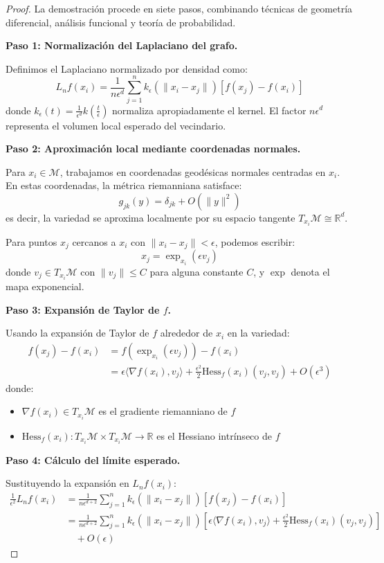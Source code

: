 \begin{proof}
	La demostración procede en siete pasos, combinando técnicas de geometría diferencial, análisis funcional y teoría de probabilidad.

	\textbf{Paso 1: Normalización del Laplaciano del grafo.}

	Definimos el Laplaciano normalizado por densidad como:
	\[
		L_n f(x_i) = \frac{1}{n \epsilon^d} \sum_{j=1}^n k_\epsilon(\|x_i - x_j\|) [f(x_j) - f(x_i)]
	\]
	donde $k_\epsilon(t) = \frac{1}{\epsilon^d} k\left(\frac{t}{\epsilon}\right)$ normaliza apropiadamente el kernel. El factor $n\epsilon^d$ representa el volumen local esperado del vecindario.

	\textbf{Paso 2: Aproximación local mediante coordenadas normales.}

	Para $x_i \in \mathcal{M}$, trabajamos en coordenadas geodésicas normales centradas en $x_i$. En estas coordenadas, la métrica riemanniana satisface:
	\[
		g_{jk}(y) = \delta_{jk} + O(\|y\|^2)
	\]
	es decir, la variedad se aproxima localmente por su espacio tangente $T_{x_i}\mathcal{M} \cong \mathbb{R}^d$.

	Para puntos $x_j$ cercanos a $x_i$ con $\|x_i - x_j\| < \epsilon$, podemos escribir:
	\[
		x_j = \exp_{x_i}(\epsilon v_j)
	\]
	donde $v_j \in T_{x_i}\mathcal{M}$ con $\|v_j\| \leq C$ para alguna constante $C$, y $\exp$ denota el mapa exponencial.

	\textbf{Paso 3: Expansión de Taylor de $f$.}

	Usando la expansión de Taylor de $f$ alrededor de $x_i$ en la variedad:
	\begin{align}
		f(x_j) - f(x_i) &= f(\exp_{x_i}(\epsilon v_j)) - f(x_i)\\
		&= \epsilon \langle \nabla f(x_i), v_j \rangle + \frac{\epsilon^2}{2} \text{Hess}_f(x_i)(v_j, v_j) + O(\epsilon^3)
	\end{align}
	donde:
	\begin{itemize}
		\item $\nabla f(x_i) \in T_{x_i}\mathcal{M}$ es el gradiente riemanniano de $f$
		\item $\text{Hess}_f(x_i): T_{x_i}\mathcal{M} \times T_{x_i}\mathcal{M} \to \mathbb{R}$ es el Hessiano intrínseco de $f$
	\end{itemize}

	\textbf{Paso 4: Cálculo del límite esperado.}

	Sustituyendo la expansión en $L_n f(x_i)$:
	\begin{align}
		\frac{1}{\epsilon^2} L_n f(x_i) &= \frac{1}{n \epsilon^{d+2}} \sum_{j=1}^n k_\epsilon(\|x_i - x_j\|) [f(x_j) - f(x_i)]\\
		&= \frac{1}{n \epsilon^{d+2}} \sum_{j=1}^n k_\epsilon(\|x_i - x_j\|) \left[\epsilon \langle \nabla f(x_i), v_j \rangle + \frac{\epsilon^2}{2} \text{Hess}_f(x_i)(v_j,v_j)\right]\\
		&\quad + O(\epsilon)
	\end{align}


\end{proof}
